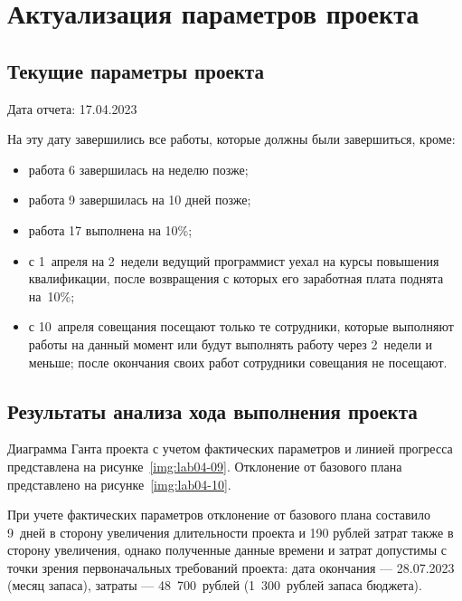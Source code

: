\clearpage
\section{Актуализация параметров проекта}

\subsection{Текущие параметры проекта}

Дата отчета: 17.04.2023

На эту дату завершились все работы, которые должны были завершиться, кроме:

\begin{itemize}
    \item работа 6 завершилась на неделю позже;
    \item работа 9 завершилась на 10 дней позже;
    \item работа 17 выполнена на 10\%;
    \item с 1~апреля на 2~недели ведущий программист уехал на курсы повышения
	  квалификации, после возвращения с которых его заработная плата
	  поднята на~10\%;
    \item с 10~апреля совещания посещают только те сотрудники, которые
        выполняют работы на данный момент или будут выполнять работу через
        2~недели и меньше; после окончания своих работ сотрудники совещания не
        посещают.
\end{itemize}

\subsection{Результаты анализа хода выполнения проекта}

Диаграмма Ганта проекта с учетом фактических параметров и линией прогресса представлена на рисунке~\ref{img:lab04-09}. Отклонение от базового плана представлено на рисунке~\ref{img:lab04-10}.



При учете фактических параметров отклонение от базового плана составило 9~дней в сторону увеличения длительности проекта и 190 рублей затрат также в сторону увеличения, однако полученные данные времени и затрат допустимы с точки зрения первоначальных требований проекта: дата окончания --- 28.07.2023 (месяц запаса), затраты --- 48~700~рублей (1~300~рублей запаса бюджета).